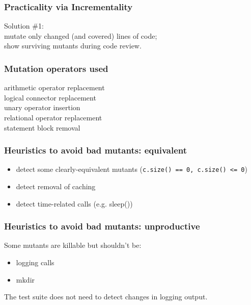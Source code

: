 \documentclass{beamer}
\newenvironment{changemargin}[1]{%
  \begin{list}{}{%
    \setlength{\topsep}{0pt}%
    \setlength{\leftmargin}{#1}%
    \setlength{\rightmargin}{1em}
    \setlength{\listparindent}{\parindent}%
    \setlength{\itemindent}{\parindent}%
    \setlength{\parsep}{\parskip}%
  }%
  \item[]}{\end{list}}
\begin{document}
\begin{frame}
  \frametitle{Practicality via Incrementality}
  \Large
  \begin{changemargin}{2em}
    Solution \#1: \\
    \qquad mutate only changed (and covered) lines of code; \\
    \qquad show surviving mutants during code review.
  \end{changemargin}
\end{frame}
  
\begin{frame}
  \frametitle{Mutation operators used}
  \Large
  \begin{changemargin}{2em}
    arithmetic operator replacement\\
    logical connector replacement\\
    unary operator insertion\\
    relational operator replacement\\
    statement block removal
  \end{changemargin}
\end{frame}

\begin{frame}
  \frametitle{Heuristics to avoid bad mutants: equivalent}
  \Large
  \begin{changemargin}{2em}
    \begin{itemize}
    \item detect some clearly-equivalent mutants
      (\texttt{c.size() == 0, c.size() <= 0})
    \item detect removal of caching
    \item detect time-related calls (e.g. sleep())
    \end{itemize}
  \end{changemargin}
\end{frame}

\begin{frame}
  \frametitle{Heuristics to avoid bad mutants: unproductive}
  \Large
  \begin{changemargin}{2em}
    Some mutants are killable but shouldn't be:
    \begin{itemize}
    \item logging calls
    \item mkdir
    \end{itemize}

    The test suite does not need to detect changes in logging output.
  \end{changemargin}
\end{frame}
\end{document}
